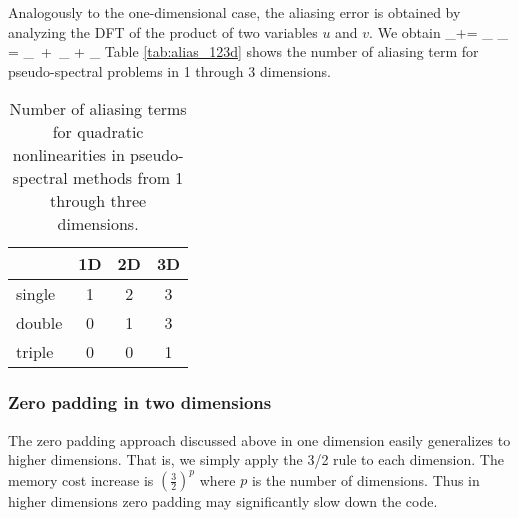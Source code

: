 \documentclass[11pt]{article}
\begin{document}
Analogously to the one-dimensional case, the aliasing error is obtained by analyzing the DFT of the product of two variables $u$ and $v$. We obtain
\beq
\label{eq:alias_error_2d_2}
\sum_{+=}\!\!\! _{} _{} = _{} \,+\,   _{} +
_{}\per
\eeq
Table \ref{tab:alias_123d} shows the number of aliasing term for pseudo-spectral problems in 1 through 3 dimensions.

\begin{table}
\label{tab:alias_123s}
\caption{Number of aliasing terms for quadratic nonlinearities in pseudo-spectral methods from 1 through three dimensions.}
\centering
\begin{tabular}{l| c c c}
    & 1D & 2D & 3D\\
    \hline
    single & 1 & 2 & 3\\
    double & 0 & 1 & 3\\
    triple & 0 & 0 & 1\\
\hline
\end{tabular}
\end{table}

\subsubsection*{Zero padding in two dimensions}
The zero padding approach discussed above in one dimension easily generalizes to higher dimensions. That is, we simply apply the 3/2 rule to each dimension. The memory cost increase is $\left(\tfrac{3}{2}\right)^p$ where $p$ is the number of dimensions. Thus in higher dimensions zero padding may significantly slow down the code. 
\end{document}
